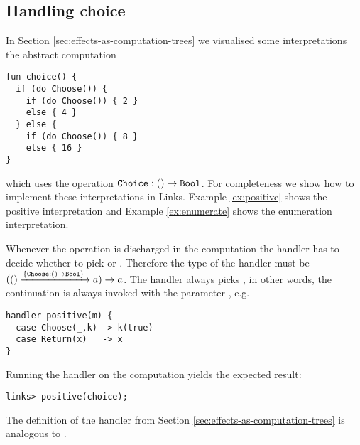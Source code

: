 
\subsection{Handling choice}\label{sec:choice}
In Section \ref{sec:effects-as-computation-trees} we visualised some interpretations the abstract computation
\begin{lstlisting}[style=links]
fun choice() {
  if (do Choose()) {
    if (do Choose()) { 2 }
    else { 4 }
  } else {
    if (do Choose()) { 8 }
    else { 16 }
}
\end{lstlisting}
which uses the operation $\texttt{Choice} : () \to \texttt{Bool}$. For completeness we show how to implement these interpretations in Links. Example \ref{ex:positive} shows the positive interpretation and Example \ref{ex:enumerate} shows the enumeration interpretation.
\begin{example}\label{ex:positive}
Whenever the operation  is discharged in the computation  the handler has to decide whether to pick  or . Therefore the type of the handler  must be
$(() \xrightarrow{\{\texttt{Choose}:() \to \texttt{Bool}\}\;} a) \to a$.
The  handler always picks , in other words, the continuation is always invoked with the parameter , e.g.
\begin{lstlisting}[style=links]
handler positive(m) {
  case Choose(_,k) -> k(true)
  case Return(x)   -> x
}
\end{lstlisting}
Running the handler on the computation  yields the expected result:
\begin{lstlisting}[style=links]
links> positive(choice);
\end{lstlisting}
The definition of the handler  from Section \ref{sec:effects-as-computation-trees} is analogous to .
\end{example}

